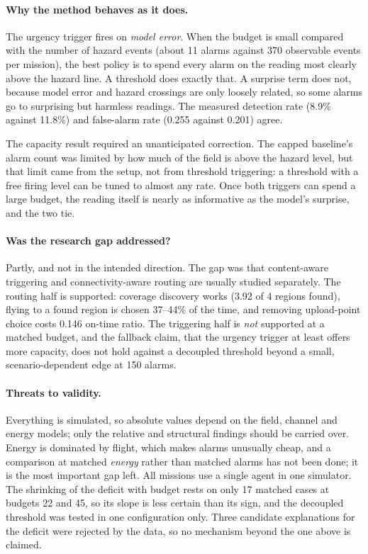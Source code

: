 \documentclass[pdflatex,sn-mathphys-num,iicol]{sn-jnl}
\theoremstyle{thmstyleone}
\theoremstyle{thmstyletwo}
\theoremstyle{thmstylethree}
\begin{document}
\paragraph{Why the method behaves as it does.} The urgency trigger fires on \emph{model
error}. When the budget is small compared with the number of hazard events (about 11
alarms against 370 observable events per mission), the best policy is to spend every alarm
on the reading most clearly above the hazard line. A threshold does exactly that. A
surprise term does not, because model error and hazard crossings are only loosely
related, so some alarms go to surprising but harmless readings. The measured detection
rate (8.9\% against 11.8\%) and false-alarm rate (0.255 against 0.201) agree.

The capacity result required an unanticipated correction. The capped baseline's alarm
count was limited by how much of the field is above the hazard level, but that limit came
from the setup, not from threshold triggering: a threshold with a free firing level can be
tuned to almost any rate. Once both triggers can spend a large budget, the reading itself
is nearly as informative as the model's surprise, and the two tie.

\paragraph{Was the research gap addressed?} Partly, and not in the intended direction. The
gap was that content-aware triggering and connectivity-aware routing are usually studied
separately. The routing half is supported: coverage discovery works (3.92 of 4 regions
found), flying to a found region is chosen 37--44\% of the time, and removing upload-point
choice costs 0.146 on-time ratio. The triggering half is \emph{not} supported at a matched
budget, and the fallback claim, that the urgency trigger at least offers more capacity,
does not hold against a decoupled threshold beyond a small, scenario-dependent edge at
150 alarms.

\paragraph{Threats to validity.} Everything is simulated, so absolute values depend on the
field, channel and energy models; only the relative and structural findings should be
carried over. Energy is dominated by flight, which makes alarms unusually cheap, and a
comparison at matched \emph{energy} rather than matched alarms has not been done; it is
the most important gap left. All missions use a single agent in one simulator. The
shrinking of the deficit with budget rests on only 17 matched cases at budgets 22 and 45,
so its slope is less certain than its sign, and the decoupled threshold was tested in one
configuration only. Three candidate explanations for the deficit were rejected by the data, so no
mechanism beyond the one above is claimed.
\end{document}
